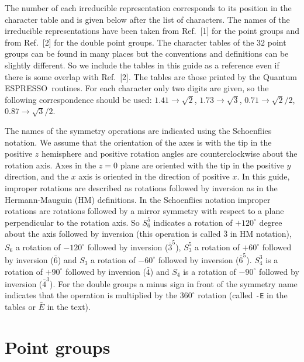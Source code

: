 \documentclass[12pt,a4paper]{article}
\def\qe{{\sc Quantum ESPRESSO}}
\begin{document}
The number of each irreducible representation corresponds to its position
in the character table and is given below after the list of characters. 
The names of the irreducible representations have been taken from Ref.~[1]
for the point groups and from Ref.~[2] for the double point groups. The character
tables of the $32$ point groups can be found in many places but the 
conventions and definitions can be slightly different. So we
include the tables in this guide as a reference even if there is some 
overlap with Ref.~[2]. The tables are those printed by the \qe\ 
routines. For each character only two digits are given, so the
following correspondence should be used:
$1.41 \rightarrow \sqrt{2}$, $1.73 \rightarrow \sqrt{3}$, 
$0.71 \rightarrow \sqrt{2}/2$, $0.87 \rightarrow \sqrt{3}/2$.

The names of the symmetry operations are indicated using
the Schoenflies notation. 
We assume that the orientation of the axes is with the tip in the positive
$z$ hemisphere and positive rotation angles are counterclockwise about 
the rotation axis. Axes in the $z=0$ plane are oriented with the tip in the
positive $y$ direction, and the $x$ axis is oriented in the direction of positive
$x$. In this guide, improper rotations are described 
as rotations followed by inversion as in the Hermann-Mauguin (HM) 
definitions. In the Schoenflies notation improper rotations are rotations
followed by a mirror symmetry with respect to a plane perpendicular to 
the rotation axis.
So $S_6^5$ indicates a rotation of $+120^\circ$ degree about the axis 
followed by inversion (this operation is called $\bar 3$ in 
HM notation), $S_6$ a rotation of 
$-120^\circ$ followed by inversion ($\bar 3^5$), $S_3^5$ a rotation 
of $+60^\circ$ followed by inversion ($\bar 6$) and
$S_3$ a rotation of $-60^\circ$ followed by inversion ($\bar 6^5$).
$S_4^3$ is a rotation of $+90^\circ$ followed by inversion ($\bar 4$) and
$S_4$ is a rotation of $-90^\circ$ followed by inversion ($\bar 4^3$).
For the double groups a minus sign in front of the symmetry name
indicates that the operation is multiplied by the $360^\circ$ rotation 
(called \texttt{-E} in the tables or $\bar E$ in the text).

\newpage
\section{\color{coral}Point groups}
\end{document}
